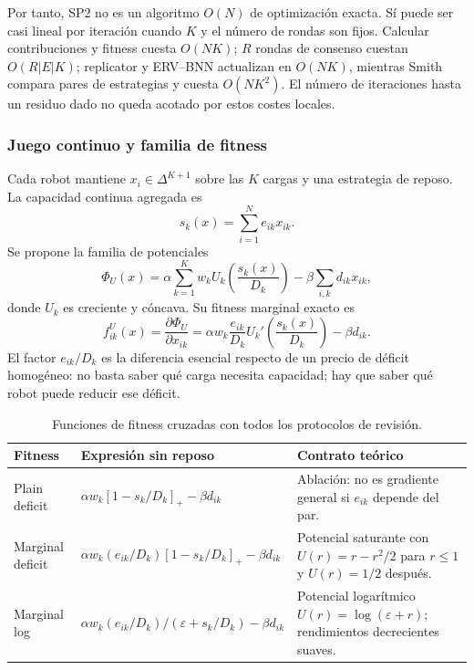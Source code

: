 Por tanto, SP2 no es un algoritmo $O(N)$ de optimización exacta. Sí puede ser casi
lineal por iteración cuando $K$ y el número de rondas son fijos. Calcular contribuciones
y fitness cuesta $O(NK)$; $R$ rondas de consenso cuestan $O(R|E|K)$; replicator y
ERV--BNN actualizan en $O(NK)$, mientras Smith compara pares de estrategias y cuesta
$O(NK^2)$. El número de iteraciones hasta un residuo dado no queda acotado por estos
costes locales.



\subsubsection{Juego continuo y familia de fitness}

Cada robot mantiene $x_i\in\Delta^{K+1}$ sobre las $K$ cargas y una estrategia de
reposo. La capacidad continua agregada es
\begin{equation}
 s_k(x)=\sum_{i=1}^{N}e_{ik}x_{ik}.
 \label{eq:sp2-continuous-capacity}
\end{equation}
Se propone la familia de potenciales
\begin{equation}
 \Phi_U(x)=\alpha\sum_{k=1}^{K}w_kU_k\!\left(\frac{s_k(x)}{D_k}\right)
 -\beta\sum_{i,k}d_{ik}x_{ik},
 \label{eq:sp2-potential-family}
\end{equation}
donde $U_k$ es creciente y cóncava. Su fitness marginal exacto es
\begin{equation}
 f_{ik}^{U}(x)=\frac{\partial\Phi_U}{\partial x_{ik}}
 =\alpha w_k\frac{e_{ik}}{D_k}
 U_k'\!\left(\frac{s_k(x)}{D_k}\right)-\beta d_{ik}.
 \label{eq:sp2-marginal-fitness}
\end{equation}
El factor $e_{ik}/D_k$ es la diferencia esencial respecto de un precio de déficit
homogéneo: no basta saber qué carga necesita capacidad; hay que saber qué robot puede
reducir ese déficit.

\begin{table}[H]
\centering
\small
\begin{tabularx}{\textwidth}{@{}p{}p{}X@{}}
\toprule
Fitness & Expresión sin reposo & Contrato teórico \\
\midrule
Plain deficit & $\alpha w_k[1-s_k/D_k]_+-\beta d_{ik}$ & Ablación: no es gradiente general si $e_{ik}$ depende del par. \\
Marginal deficit & $\alpha w_k(e_{ik}/D_k)[1-s_k/D_k]_+-\beta d_{ik}$ & Potencial saturante con $U(r)=r-r^2/2$ para $r\leq1$ y $U(r)=1/2$ después. \\
Marginal log & $\alpha w_k(e_{ik}/D_k)/(\varepsilon+s_k/D_k)-\beta d_{ik}$ & Potencial logarítmico $U(r)=\log(\varepsilon+r)$; rendimientos decrecientes suaves. \\
\bottomrule
\end{tabularx}
\caption{Funciones de fitness cruzadas con todos los protocolos de revisión.}
\label{tab:sp2-fitness-family}
\end{table}

